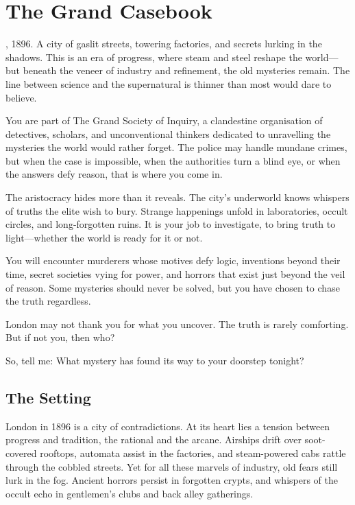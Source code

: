 \chapter{The Grand Casebook}\label{chap:grand-casebook}

\begin{DndReadAloud}{}
, 1896. A city of gaslit streets, towering factories, and secrets lurking in the shadows. This is an era of progress, where steam and steel reshape the world—but beneath the veneer of industry and refinement, the old mysteries remain. The line between science and the supernatural is thinner than most would dare to believe.

You are part of The Grand Society of Inquiry, a clandestine organisation of detectives, scholars, and unconventional thinkers dedicated to unravelling the mysteries the world would rather forget. The police may handle mundane crimes, but when the case is impossible, when the authorities turn a blind eye, or when the answers defy reason, that is where you come in.

The aristocracy hides more than it reveals. The city’s underworld knows whispers of truths the elite wish to bury. Strange happenings unfold in laboratories, occult circles, and long-forgotten ruins. It is your job to investigate, to bring truth to light—whether the world is ready for it or not.

You will encounter murderers whose motives defy logic, inventions beyond their time, secret societies vying for power, and horrors that exist just beyond the veil of reason. Some mysteries should never be solved, but you have chosen to chase the truth regardless.

London may not thank you for what you uncover. The truth is rarely comforting. But if not you, then who?

So, tell me: What mystery has found its way to your doorstep tonight?
\end{DndReadAloud}

\section{The Setting}

London in 1896 is a city of contradictions. At its heart lies a tension between progress and tradition, the rational and the arcane. Airships drift over soot-covered rooftops, automata assist in the factories, and steam-powered cabs rattle through the cobbled streets. Yet for all these marvels of industry, old fears still lurk in the fog. Ancient horrors persist in forgotten crypts, and whispers of the occult echo in gentlemen’s clubs and back alley gatherings.

